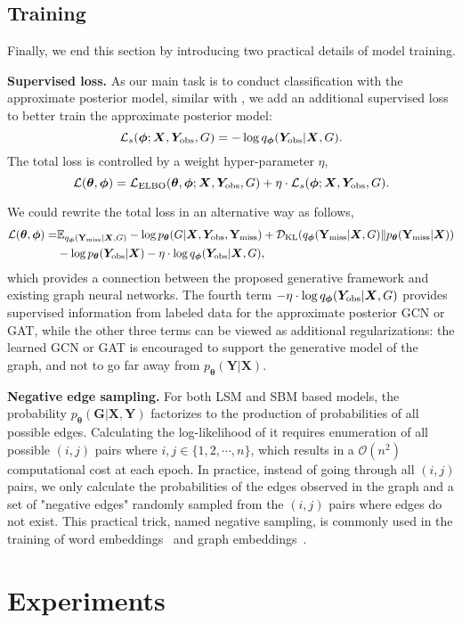 \documentclass{article}
\newcommand{\vpara}[1]{\vspace{0.05in}\noindent\textbf{#1 }}
\def\rmG{{\mathbf{G}}}
\def\rmX{{\mathbf{X}}}
\def\rmY{{\mathbf{Y}}}
\def\vtheta{{\bm{\theta}}}
\def\mX{{\bm{X}}}
\def\mY{{\bm{Y}}}
\def\gD{{\mathcal{D}}}
\def\gL{{\mathcal{L}}}
\def\gO{{\mathcal{O}}}
\newcommand{\E}{\mathbb{E}}
\newcommand{\Yobs}{\mY_{\rm{obs}}}
\newcommand{\rYmiss}{\rmY_{\rm{miss}}}
\def\vphi{{\bm{\phi}}}
\begin{document}
\subsection{Training}
Finally, we end this section by introducing two practical details of model training.

\vpara{Supervised loss.}
As our main task is to conduct classification with the approximate posterior model, similar with \citet{kingma2014semi}, we add an additional supervised loss to better train the approximate posterior model:
$$\gL_s(\vphi;\mX, \Yobs, G) = -\log q_{\vphi}(\Yobs|\mX, G).$$
The total loss is controlled by a weight hyper-parameter $\eta$, 
$$\gL(\vtheta, \vphi) = \gL_{\rm{ELBO}}(\vtheta, \vphi;\mX, \Yobs, G) + \eta \cdot \gL_s(\vphi;\mX, \Yobs, G).$$

We could rewrite the total loss in an alternative way as follows,
\begin{align*}
	\gL(\vtheta, \vphi) = &\E_{q_{\vphi}(\rYmiss|\mX, G)}-\log p_{\vtheta}(G|\mX, \Yobs, \rYmiss) + \gD_{\rm{KL}}(q_{\vphi}(\rYmiss|\mX, G)\|p_{\vtheta}(\rYmiss|\mX)) \\
	&-\log p_{\vtheta}(\Yobs|\mX) - \eta \cdot \log q_{\vphi}(\Yobs|\mX, G),
\end{align*}
which provides a connection between the proposed generative framework and existing graph neural networks. The fourth term $- \eta \cdot \log q_{\vphi}(\Yobs|\mX, G)$ provides supervised information from labeled data for the approximate posterior GCN or GAT, while the other three terms can be viewed as additional regularizations: the learned GCN or GAT is encouraged to support the generative model of the graph, and not to go far away from $p_{\vtheta}(\rmY|\rmX)$.

\vpara{Negative edge sampling.}
For both LSM and SBM based models, the probability $p_{\vtheta}(\rmG|\rmX, \rmY)$ factorizes to the production of probabilities of all possible edges. Calculating the log-likelihood of it requires enumeration of all possible $(i, j)$ pairs where $i, j \in \{1, 2, \cdots, n\}$, which results in a $\gO(n^2)$ computational cost at each epoch. In practice, instead of going through all $(i, j)$ pairs, we only calculate the probabilities of the edges observed in the graph and a set of "negative edges" randomly sampled from the $(i, j)$ pairs where edges do not exist. This practical trick, named negative sampling, is commonly used in the training of word embeddings~\cite{mikolov2013efficient} and graph embeddings~\cite{tang2015line}. 
 \section{Experiments}
\label{sec:exp}
\end{document}
